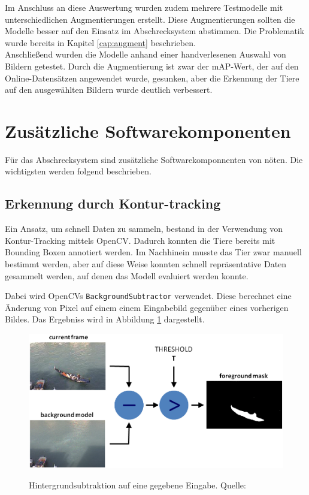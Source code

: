 Im Anschluss an diese Auswertung wurden zudem mehrere Testmodelle mit unterschiedlichen Augmentierungen erstellt. Diese Augmentierungen sollten die Modelle besser auf den Einsatz im Abschrecksystem abstimmen. Die Problematik wurde bereits in Kapitel \ref{cap:augment} beschrieben.
\\
Anschließend wurden die Modelle anhand einer handverlesenen Auswahl von Bildern getestet. Durch die Augmentierung ist zwar der \ac{mAP}-Wert, der auf den Online-Datensätzen angewendet wurde, gesunken, aber die Erkennung der Tiere auf den ausgewählten Bildern wurde deutlich verbessert.

\section{Zusätzliche Softwarekomponenten}

Für das Abschrecksystem sind zusätzliche Softwarekomponnenten von nöten. Die wichtigsten werden folgend beschrieben.

\subsection{Erkennung durch Kontur-tracking}

Ein Ansatz, um schnell Daten zu sammeln, bestand in der Verwendung von Kontur-Tracking mittels OpenCV. Dadurch konnten die Tiere bereits mit Bounding Boxen annotiert werden. Im Nachhinein musste das Tier zwar manuell bestimmt werden, aber auf diese Weise konnten schnell repräsentative Daten gesammelt werden, auf denen das Modell evaluiert werden konnte.

Dabei wird OpenCVs \verb|BackgroundSubtractor| verwendet. Diese berechnet eine Änderung von Pixel auf einem einem Eingabebild gegenüber eines vorherigen Bildes. Das Ergebniss wird in Abbildung \ref{fig:back_sub} dargestellt.

\begin{figure}[H]
    \centering
    \includegraphics[width=\textwidth]{images/Background_Subtraction_Tutorial_Scheme.png}
    \label{fig:back_sub}
    \caption{Hintergrundsubtraktion auf eine gegebene Eingabe. Quelle: \cite{background_sub}}
\end{figure}

